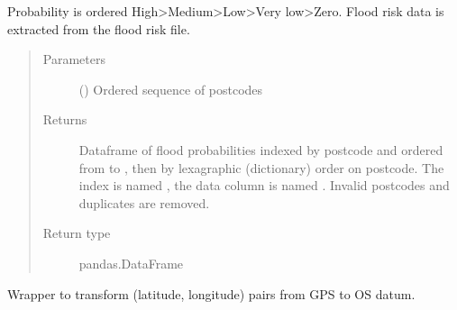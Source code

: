 \documentclass[letterpaper,10pt,english]{sphinxmanual}
\begin{document}
\begin{fulllineitems}
\begin{fulllineitems}
Probability is ordered High\textgreater{}Medium\textgreater{}Low\textgreater{}Very low\textgreater{}Zero.
Flood risk data is extracted from the  flood risk file.
\begin{quote}\begin{description}
\item[{Parameters}] \leavevmode
{} () \textendash{} Ordered sequence of postcodes

\item[{Returns}] \leavevmode
Dataframe of flood probabilities indexed by postcode and ordered from  to ,
then by lexagraphic (dictionary) order on postcode. The index is named , the
data column is named . Invalid postcodes and duplicates
are removed.

\item[{Return type}] \leavevmode
pandas.DataFrame

\end{description}\end{quote}

\end{fulllineitems}


\end{fulllineitems}


\begin{fulllineitems}
\label{\detokenize{index:flood_tool.WGS84toOSGB36}}
Wrapper to transform (latitude, longitude) pairs
from GPS to OS datum.

\end{fulllineitems}

\end{document}
